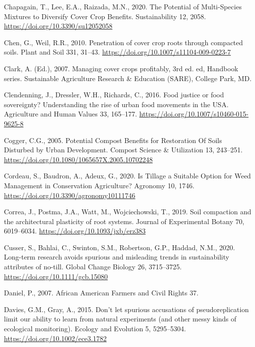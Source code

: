\documentclass[
  12pt,
]{article}
\newlength{\cslhangindent}
\newlength{\cslentryspacingunit} %
\newenvironment{CSLReferences}[2] %
 {%
  \setlength{\parindent}{0pt}
  \ifodd #1
  \let\oldpar\par
  \def\par{\hangindent=\cslhangindent\oldpar}
  \fi
  \setlength{\parskip}{#2\cslentryspacingunit}
 }%
 {}
\begin{document}
\begin{CSLReferences}{1}{0}
\leavevmode{}%
Chapagain, T., Lee, E.A., Raizada, M.N., 2020. The {Potential} of {Multi-Species Mixtures} to {Diversify Cover Crop Benefits}. Sustainability 12, 2058. \url{https://doi.org/10.3390/su12052058}

\leavevmode{}%
Chen, G., Weil, R.R., 2010. Penetration of cover crop roots through compacted soils. Plant and Soil 331, 31--43. \url{https://doi.org/10.1007/s11104-009-0223-7}

\leavevmode{}%
Clark, A. (Ed.), 2007. Managing cover crops profitably, 3rd ed. ed, Handbook series. {Sustainable Agriculture Research \& Education (SARE)}, {College Park, MD}.

\leavevmode{}%
Clendenning, J., Dressler, W.H., Richards, C., 2016. Food justice or food sovereignty? {Understanding} the rise of urban food movements in the {USA}. Agriculture and Human Values 33, 165--177. \url{https://doi.org/10.1007/s10460-015-9625-8}

\leavevmode{}%
Cogger, C.G., 2005. Potential {Compost Benefits} for {Restoration Of Soils Disturbed} by {Urban Development}. Compost Science \& Utilization 13, 243--251. \url{https://doi.org/10.1080/1065657X.2005.10702248}

\leavevmode{}%
Cordeau, S., Baudron, A., Adeux, G., 2020. Is {Tillage} a {Suitable Option} for {Weed Management} in {Conservation Agriculture}? Agronomy 10, 1746. \url{https://doi.org/10.3390/agronomy10111746}

\leavevmode{}%
Correa, J., Postma, J.A., Watt, M., Wojciechowski, T., 2019. Soil compaction and the architectural plasticity of root systems. Journal of Experimental Botany 70, 6019--6034. \url{https://doi.org/10.1093/jxb/erz383}

\leavevmode{}%
Cusser, S., Bahlai, C., Swinton, S.M., Robertson, G.P., Haddad, N.M., 2020. Long-term research avoids spurious and misleading trends in sustainability attributes of no-till. Global Change Biology 26, 3715--3725. \url{https://doi.org/10.1111/gcb.15080}

\leavevmode{}%
Daniel, P., 2007. African {American Farmers} and {Civil Rights} 37.

\leavevmode{}%
Davies, G.M., Gray, A., 2015. Don't let spurious accusations of pseudoreplication limit our ability to learn from natural experiments (and other messy kinds of ecological monitoring). Ecology and Evolution 5, 5295--5304. \url{https://doi.org/10.1002/ece3.1782}


\end{CSLReferences}
\end{document}
